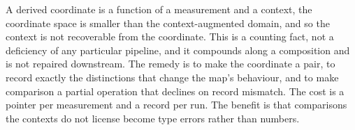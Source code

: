 \documentclass[11pt,a4paper]{article}
\theoremstyle{definition}
\theoremstyle{remark}
\begin{document}
A derived coordinate is a function of a measurement and a context, the
coordinate space is smaller than the context-augmented domain, and so the
context is not recoverable from the coordinate. This is a counting fact,
not a deficiency of any particular pipeline, and it compounds along a
composition and is not repaired downstream. The remedy is to make the
coordinate a pair, to record exactly the distinctions that change the
map's behaviour, and to make comparison a partial operation that declines
on record mismatch. The cost is a pointer per measurement and a record
per run. The benefit is that comparisons the contexts do not license
become type errors rather than numbers.



\end{document}
